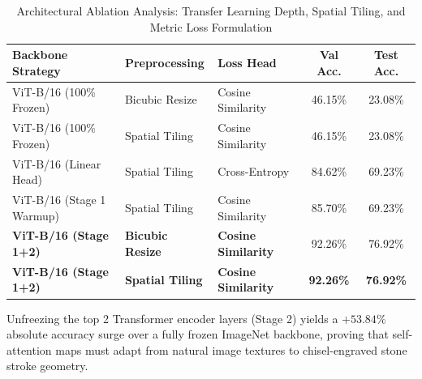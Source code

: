 \begin{table}[t]
\centering
\caption{Architectural Ablation Analysis: Transfer Learning Depth, Spatial Tiling, and Metric Loss Formulation}
\label{tab:ablation_study}
\small
\begin{tabular}{l l l c c}
\toprule
\textbf{Backbone Strategy} & \textbf{Preprocessing} & \textbf{Loss Head} & \textbf{Val Acc.} & \textbf{Test Acc.} \\
\midrule
ViT-B/16 (100\% Frozen)   & Bicubic Resize  & Cosine Similarity & 46.15\% & 23.08\% \\
ViT-B/16 (100\% Frozen)   & Spatial Tiling  & Cosine Similarity & 46.15\% & 23.08\% \\
ViT-B/16 (Linear Head)    & Spatial Tiling  & Cross-Entropy     & 84.62\% & 69.23\% \\
ViT-B/16 (Stage 1 Warmup) & Spatial Tiling  & Cosine Similarity & 85.70\% & 69.23\% \\
\textbf{ViT-B/16 (Stage 1+2)} & \textbf{Bicubic Resize}  & \textbf{Cosine Similarity} & 92.26\% & 76.92\% \\
\textbf{ViT-B/16 (Stage 1+2)} & \textbf{Spatial Tiling}  & \textbf{Cosine Similarity} & \textbf{92.26\%} & \textbf{76.92\%} \\
\bottomrule
\end{tabular}
\vspace{1mm}
\begin{minipage}{\linewidth}
\footnotesize Unfreezing the top 2 Transformer encoder layers (Stage 2) yields a $+53.84\%$ absolute accuracy surge over a fully frozen ImageNet backbone, proving that self-attention maps must adapt from natural image textures to chisel-engraved stone stroke geometry.
\end{minipage}
\end{table}
